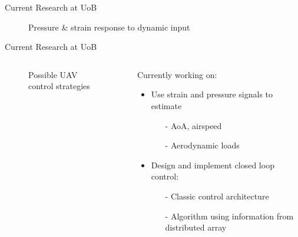 \documentclass[aspectratio=169]{beamer}            %
\begin{document}
\begin{frame}{Current Research at UoB}

  \begin{figure}[!htb]
    \centering
		
		\caption{Pressure \& strain response to dynamic input}
		\label{fig:DistSens_DynResponse}
  \end{figure}

\end{frame}

\begin{frame}{Current Research at UoB}

  \vspace{-1.5em}
	\begin{columns}
	  \begin{column}{0.6\textwidth}
		  \begin{figure}[!htb]
        \centering
				
				\caption{Possible UAV control strategies}
				\label{fig:ANN_UAVCtrl_BlockDiagram}
      \end{figure}
		\end{column}
    \begin{column}{0.4\textwidth}
		  Currently working on:
      \pause
      \begin{itemize}[<+->]
        \item{Use strain and pressure signals to estimate}
			  \begin{itemize}[<+->]
			    \item[-]{AoA, airspeed}
          \item[-]{Aerodynamic loads}
			  \end{itemize}
		    \item{Design and implement closed loop control:}
			  \begin{itemize}[<+->]
			    \item[-]{Classic control architecture}
          \item[-]{Algorithm using information from distributed array}
			  \end{itemize}
      \end{itemize}
		\end{column}
	\end{columns}

\end{frame}

\end{document}
